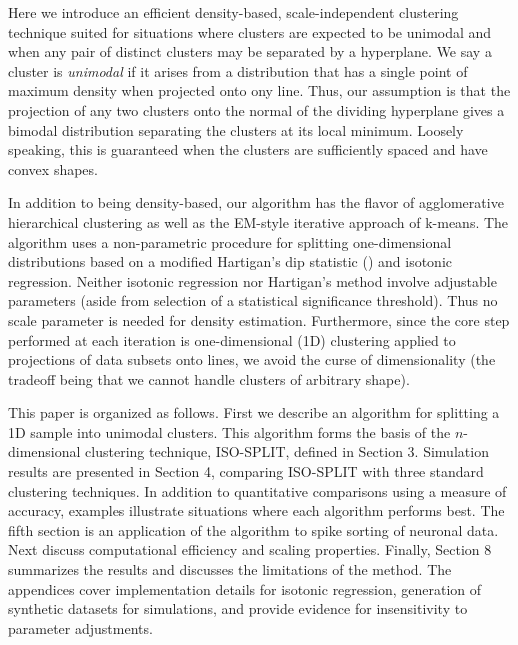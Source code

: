 \documentclass[10pt]{article}
\begin{document}
Here we introduce an efficient density-based, scale-independent clustering technique suited for situations where clusters are expected to be unimodal and when any pair of distinct clusters may be separated by a hyperplane. We say a cluster is {\em unimodal} if it arises from a distribution that has a single point of maximum density when projected onto ony line. Thus, our assumption is that the projection of any two clusters onto the normal of the dividing hyperplane gives a bimodal distribution separating the clusters at its local minimum. Loosely speaking, this is guaranteed when the clusters are sufficiently spaced and have convex shapes.

In addition to being density-based, our algorithm has the flavor of agglomerative hierarchical clustering as well as the EM-style iterative approach of k-means. The algorithm uses a non-parametric procedure for splitting one-dimensional distributions based on a modified Hartigan's dip statistic (\cite{hartigan1985dip}) and isotonic regression. Neither isotonic regression nor Hartigan's method involve adjustable parameters (aside from selection of a statistical significance threshold). Thus no scale parameter is needed for density estimation. Furthermore, since the core step performed at each iteration is one-dimensional (1D) clustering applied to projections of data subsets onto lines, we avoid the curse of dimensionality (the tradeoff being that we cannot handle clusters of arbitrary shape).

This paper is organized as follows. First we describe an algorithm for splitting a 1D sample into unimodal clusters. This algorithm forms the basis of the $n$-dimensional clustering technique, ISO-SPLIT, defined in Section 3. Simulation results are presented in Section 4, comparing ISO-SPLIT with three standard clustering techniques. In addition to quantitative comparisons using a measure of accuracy, examples illustrate situations where each algorithm performs best. The fifth section is an application of the algorithm to spike sorting of neuronal data. Next discuss computational efficiency and scaling properties. Finally, Section 8 summarizes the results and discusses the limitations of the method. The appendices cover implementation details for isotonic regression, generation of synthetic datasets for simulations, and provide evidence for insensitivity to parameter adjustments.
\end{document}
